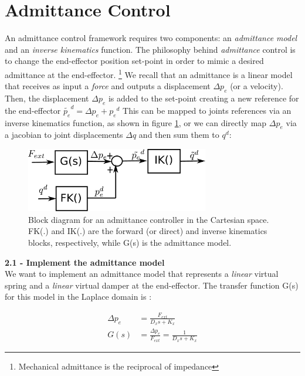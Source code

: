 \documentclass[11pt]{article}
\begin{document}
\section{Admittance Control}
An admittance control framework requires two components: an \textit{admittance model} and an \textit{inverse kinematics} function.
The philosophy behind \textit{admittance} control is to change the end-effector position set-point in order to mimic a desired admittance at the end-effector. 
\footnote{Mechanical admittance is the reciprocal of impedance} We recall that an admittance is a linear model that receives  as input a \textit{force} and 
outputs a displacement $\Delta p_e$ (or a velocity). Then, the displacement $\Delta p_e$ is added to the set-point creating a new reference for the end-effector $\tilde{p_e}^d = \Delta p_e + {p_e}^d$  This can be mapped to joints references via an inverse kinematics function, as shown in figure \ref{fig:admittance}, or we can directly map $\Delta p_e$ via a jacobian to joint displacements $\Delta{q}$ and then sum them to $q^d$:\\

\begin{figure}[bht]
	\centering
	\includegraphics[width=8cm]{pics/admittanceControl.pdf}
	\caption{Block diagram for an admittance controller in the Cartesian space. FK(.) and IK(.) are the forward (or direct) and inverse kinematics blocks, respectively, while G(s) is the admittance model.}
	\label{fig:admittance}
\end{figure}

\textbf{2.1 - Implement the admittance model }\\
We want to implement an admittance model that represents a \textit{linear} virtual spring and a \textit{linear} virtual damper at the end-effector.
The transfer function G(s) for this model in the Laplace domain is :



\begin{align}
\label{eq:tf}
\Delta p_e &= \frac{ F_{ext} }{D_x s + K_x}\\
G(s)& = \frac{\Delta p_e}{F_{ext}} = \frac{ 1 }{D_x s + K_x} \nonumber
\end{align}
\end{document}
